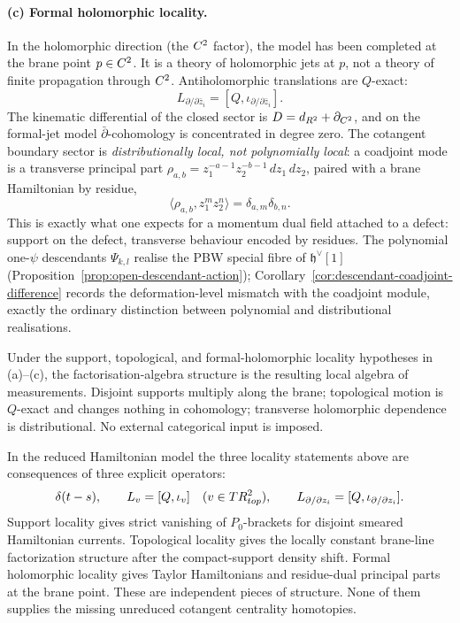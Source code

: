 \documentclass[11pt]{memoir}
\begin{document}
\paragraph{(c) Formal holomorphic locality.}
In the holomorphic direction (the $C^2$ factor), the model has been
completed at the brane point $p\in C^2$. It is a theory of holomorphic
jets at $p$, not a theory of finite propagation through $C^2$.
Antiholomorphic translations are $Q$-exact:
$$L_{\partial/\partial\bar z_i}
  =[Q,\iota_{\partial/\partial\bar z_i}].$$
The kinematic differential of the closed sector is
$D=d_{R^2}+\partial_{C^2}$, and on the formal-jet model
$\bar\partial$-cohomology is concentrated in degree zero. The cotangent
boundary sector is \emph{distributionally local, not polynomially local}:
a coadjoint mode is a transverse principal part
$\rho_{a,b}=z_1^{-a-1}z_2^{-b-1}\,dz_1\,dz_2$, paired with a brane
Hamiltonian by residue,
$$\langle\rho_{a,b},z_1^mz_2^n\rangle=\delta_{a,m}\delta_{b,n}.$$
This is exactly what one expects for a momentum dual field attached to a
defect: support on the defect, transverse behaviour encoded by residues.
The polynomial one-$\psi$ descendants $\Psi_{k,l}$ realise the PBW
special fibre of $\mathfrak h^\vee[1]$
(Proposition~\ref{prop:open-descendant-action});
Corollary~\ref{cor:descendant-coadjoint-difference} records the
deformation-level mismatch with the coadjoint module, exactly the ordinary
distinction between polynomial and distributional realisations.

Under the support, topological, and formal-holomorphic locality hypotheses
in (a)--(c), the factorisation-algebra structure is the resulting local
algebra of measurements. Disjoint supports multiply along the brane;
topological motion is $Q$-exact and changes nothing in cohomology;
transverse holomorphic dependence is distributional. No external categorical
input is imposed.

\begin{prop}
  \label{prop:three-localities}
  In the reduced Hamiltonian model the three locality statements above
  are consequences of three explicit operators:
  \[
    \delta(t-s),\qquad
    L_v=[Q,\iota_v]\quad(v\in TR^2_{top}),\qquad
    L_{\partial/\partial z_i}
      =[Q,\iota_{\partial/\partial z_i}].
  \]
  Support locality gives strict vanishing of \(P_0\)-brackets for
  disjoint smeared Hamiltonian currents. Topological locality gives the
  locally constant brane-line factorization structure after the
  compact-support density shift. Formal holomorphic locality gives
  Taylor Hamiltonians and residue-dual principal parts at the brane point.
  These are independent pieces of structure. None of them supplies the
  missing unreduced cotangent centrality homotopies.
\end{prop}
\end{document}
